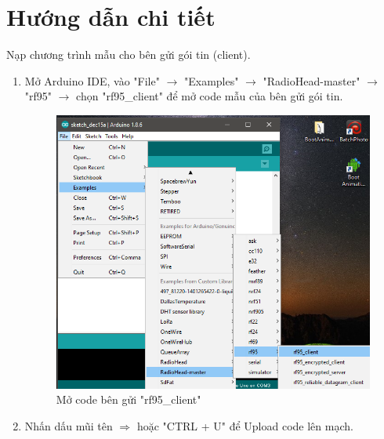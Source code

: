 \section{Hướng dẫn chi tiết}
Nạp chương trình mẫu cho bên gửi gói tin (client).
\begin{enumerate}
\item Mở Arduino IDE, vào "File" $\rightarrow$ "Examples" $\rightarrow$ "RadioHead-master" $\rightarrow$ "rf95" $\rightarrow$ chọn "rf95\_client" để mở code mẫu của bên gửi gói tin.
\begin{center}
\begin{figure}[htp]
\begin{center}
\includegraphics[scale=0.8]{image4/arduino13.png}
\end{center}
\caption{Mở code bên gửi "rf95\_client"}
\end{figure}
\end{center}
\newpage
\item Nhấn dấu mũi tên \textbf{$\Rightarrow$} hoặc "CTRL + U" để Upload code lên mạch.
\begin{center}
\begin{figure}[htp]
\begin{center}

\end{center}
\end{figure}
\end{center}
\end{enumerate}

